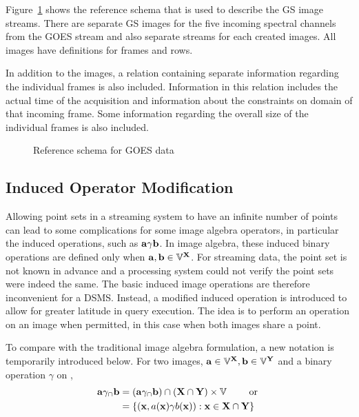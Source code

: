\documentclass{ucdthesis}       %
\begin{document}
Figure~\ref{fig:reference_schema} shows the reference schema that is
used to describe the \ac{GS} image streams.  There are separate
\ac{GS} images for the five incoming spectral channels from the
\ac{GOES} stream and also separate streams for each created
images.  All images have definitions for frames and rows.

In addition to the images, a relation containing separate information
regarding the individual frames is also included.  Information in this
relation includes the actual time of the acquisition and information
about the constraints on domain of that incoming frame.  Some
information regarding the overall size of the individual frames is
also included.

\begin{figure}[htb]
  \begin{center}
    \scalebox{0.7}{}
    \caption{Reference schema for GOES data}
    \label{fig:reference_schema}
  \end{center}
\end{figure}

\subsection{Induced Operator Modification}
\label{sec:induced-mod}

Allowing point sets in a streaming system to have an infinite number
of points can lead to some complications for some image algebra
operators, in particular the induced operations, such as ${\bf{a}}
\gamma {\ensuremath{\bf{b}}}$.  In image algebra, these induced binary operations are
defined only when ${\bf{a}},{\bf{b}} \in {\ensuremath{\mathbb{V}}}^{{\bf{X}}}$.  For streaming
data, the point set is not known in advance and a processing system
could not verify the point sets were indeed the same.  The basic
induced image operations are therefore inconvenient for a \ac{DSMS}.
Instead, a modified induced operation is introduced to allow for
greater latitude in query execution.  The idea is to perform an
operation on an image when permitted, in this case when both images
share a point.

To compare with the traditional image algebra formulation, a new
notation is temporarily introduced below.  For two images, ${\bf{a}} \in
{\ensuremath{\mathbb{V}}}^{{\bf{X}}}, {\bf{b}} \in {\ensuremath{\mathbb{V}}}^{{\bf{Y}}}$ and a binary operation
$\gamma$ on ,
\begin{align*}
  {\ensuremath{\bf{a}}} \gamma_\cap {\ensuremath{\bf{b}}} &=({\bf{a}} \gamma_\cap {\ensuremath{\bf{b}}}) \cap ({\bf{X}} \cap {\ensuremath{\bf{Y}}}) \times {\ensuremath{\mathbb{V}}} \quad\quad\text{ or }\\
  &= \{ ({\bf{x}},a({\bf{x}}) \gamma b({\bf{x}})) : {\bf{x}} \in {\ensuremath{\bf{X}}} \cap
  {\ensuremath{\bf{Y}}} \}
\end{align*}
\end{document}
